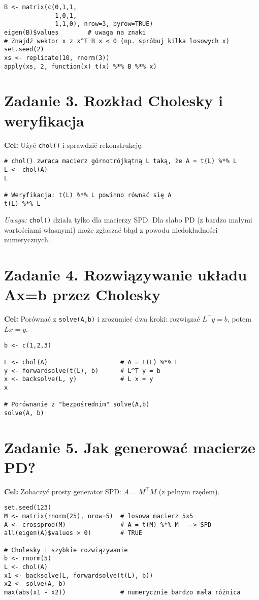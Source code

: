 \documentclass[12pt]{article}
\begin{document}
\begin{lstlisting}
B <- matrix(c(0,1,1,
              1,0,1,
              1,1,0), nrow=3, byrow=TRUE)
eigen(B)$values        # uwaga na znaki
# Znajdź wektor x z x^T B x < 0 (np. spróbuj kilka losowych x)
set.seed(2)
xs <- replicate(10, rnorm(3))
apply(xs, 2, function(x) t(x) %*% B %*% x)
\end{lstlisting}

\section*{Zadanie 3. Rozkład Cholesky i weryfikacja}
\textbf{Cel:} Użyć \texttt{chol()} i sprawdzić rekonstrukcję.

\begin{lstlisting}
# chol() zwraca macierz górnotrójkątną L taką, że A = t(L) %*% L
L <- chol(A)
L

# Weryfikacja: t(L) %*% L powinno równać się A
t(L) %*% L
\end{lstlisting}

\noindent\textit{Uwaga:} \texttt{chol()} działa tylko dla macierzy SPD. Dla słabo PD (z bardzo małymi wartościami własnymi) może zgłaszać błąd z powodu niedokładności numerycznych.

\section*{Zadanie 4. Rozwiązywanie układu Ax=b przez Cholesky}
\textbf{Cel:} Porównać z \texttt{solve(A,b)} i zrozumieć dwa kroki: rozwiązać $L^\top y=b$, potem $Lx=y$.

\begin{lstlisting}
b <- c(1,2,3)

L <- chol(A)                    # A = t(L) %*% L
y <- forwardsolve(t(L), b)      # L^T y = b
x <- backsolve(L, y)            # L x = y
x

# Porównanie z "bezpośrednim" solve(A,b)
solve(A, b)
\end{lstlisting}

\section*{Zadanie 5. Jak generować macierze PD?}
\textbf{Cel:} Zobaczyć prosty generator SPD: $A=M^\top M$ (z pełnym rzędem).

\begin{lstlisting}
set.seed(123)
M <- matrix(rnorm(25), nrow=5)  # losowa macierz 5x5
A <- crossprod(M)               # A = t(M) %*% M  --> SPD
all(eigen(A)$values > 0)        # TRUE

# Cholesky i szybkie rozwiązywanie
b <- rnorm(5)
L <- chol(A)
x1 <- backsolve(L, forwardsolve(t(L), b))
x2 <- solve(A, b)
max(abs(x1 - x2))               # numerycznie bardzo mała różnica
\end{lstlisting}
\end{document}
